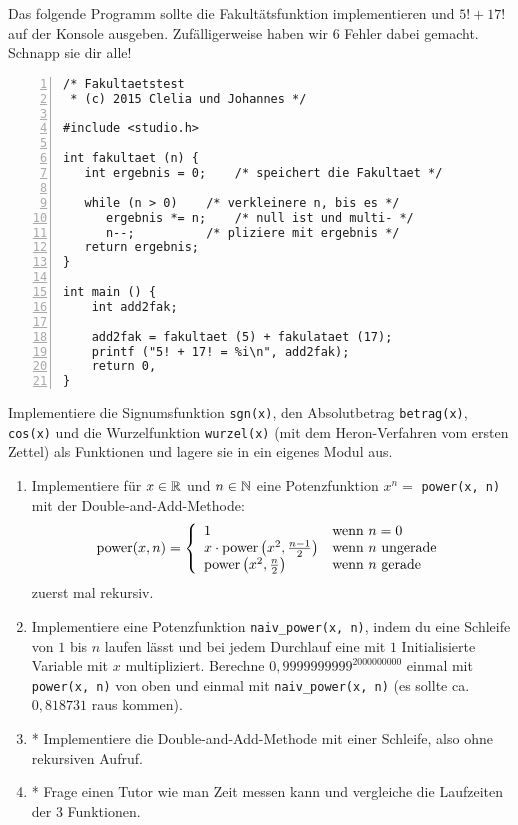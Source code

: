 \documentclass{uebungszettel}
\begin{document}
\begin{aufg}
Das folgende Programm sollte die Fakult\"atsfunktion implementieren
und $5! + 17!$ auf der Konsole ausgeben.
Zuf\"alligerweise haben wir $6$ Fehler dabei gemacht.
Schnapp sie dir alle! 

\begin{codelisting}
\begin{lstlisting}[numbers=left,numberstyle=\tiny,frame=tlrb,showstringspaces=false]
/* Fakultaetstest 
 * (c) 2015 Clelia und Johannes */

#include <studio.h>

int fakultaet (n) {
   int ergebnis = 0;    /* speichert die Fakultaet */
	
   while (n > 0) 	/* verkleinere n, bis es */
      ergebnis *= n;    /* null ist und multi- */
      n--;	        /* pliziere mit ergebnis */
   return ergebnis;
}

int main () {
	int add2fak;

	add2fak = fakultaet (5) + fakulataet (17);
	printf ("5! + 17! = %i\n", add2fak);
	return 0,
}
\end{lstlisting}
\end{codelisting}
\end{aufg}

\begin{aufg}
Implementiere die Signumsfunktion \verb|sgn(x)|, den Absolutbetrag \verb|betrag(x)|, \verb|cos(x)| und die Wurzelfunktion \verb|wurzel(x)| (mit dem Heron-Verfahren vom ersten Zettel) als Funktionen und lagere sie in ein eigenes Modul aus.
\end{aufg}

\begin{aufg}
\begin{enumerate}[leftmargin=*]
\item Implementiere für $x \in \mathbb{R}$ und $n \in \mathbb{N}$ eine Potenzfunktion $x^n=$ \verb|power(x, n)| mit der Double-and-Add-Methode: \[
	\mathrm{power}(x, n) = \left\{ \begin{array}{ll}
	1 & \text{wenn } n = 0 \\
	x \cdot \mathrm{power}\left(x^2, \frac{n-1}{2}\right) & \text{wenn } n \text{ ungerade} \\
	\mathrm{power}\left(x^2, \frac{n}{2}\right) & \text{wenn } n \text{ gerade} \\
	\end{array}
	\right.
\]
zuerst mal rekursiv. 
\item Implementiere eine Potenzfunktion \verb|naiv_power(x, n)|, indem du eine Schleife von $1$ bis $n$ laufen lässt und bei jedem Durchlauf eine mit $1$ Initialisierte Variable mit $x$ multipliziert. Berechne $0,9999999999^{2000000000}$ einmal mit \verb|power(x, n)| von oben und einmal mit \verb|naiv_power(x, n)| (es sollte ca. $0,818731$ raus kommen). 
\item* Implementiere die Double-and-Add-Methode mit einer Schleife, also ohne rekursiven Aufruf.
\item* Frage einen Tutor wie man Zeit messen kann und vergleiche die Laufzeiten der 3 Funktionen.
\end{enumerate}
\end{aufg}
\end{document}
